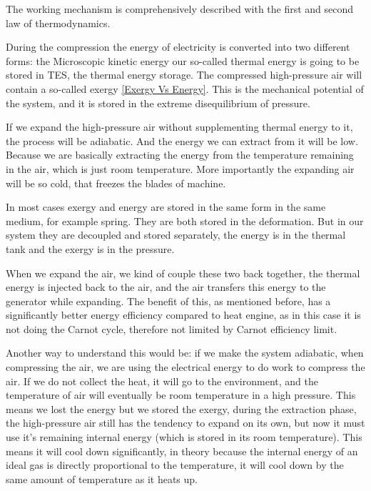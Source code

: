 The working mechanism is comprehensively described with the first and second law of thermodynamics.

During the compression the energy of electricity is converted into two different forms: the Microscopic kinetic energy our so-called thermal energy is going to be stored in TES, the thermal energy storage. The compressed high-pressure air will contain a so-called exergy \href{https://www.youtube.com/watch?v=2TPefBIVZZo&pp=ygUGZXhlcmd5}{[Exergy Vs Energy]}. This is the mechanical potential of the system, and it is stored in the extreme disequilibrium of pressure. 

If we expand the high-pressure air without supplementing thermal energy to it, the process will be adiabatic. And the energy we can extract from it will be low. Because we are basically extracting the energy from the temperature remaining in the air, which is just room temperature. More importantly the expanding air will be so cold, that freezes the blades of machine. 

In most cases exergy and energy are stored in the same form in the same medium, for example spring. They are both stored in the deformation. But in our system they are decoupled and stored separately, the energy is in the thermal tank and the exergy is in the pressure.  

When we expand the air, we kind of couple these two back together, the thermal energy is injected back to the air, and the air transfers this energy to the generator while expanding. The benefit of this, as mentioned before, has a significantly better energy efficiency compared to heat engine, as in this case it is not doing the Carnot cycle, therefore not limited by Carnot efficiency limit. 

\vspace{2em}

Another way to understand this would be:
 if we make the system adiabatic,  
 when compressing the air, we are using the electrical energy to do work to compress the air. If we do not collect the heat, it will go to the environment, and the temperature of air will eventually be room temperature in a high pressure. This means we lost the energy but we stored the exergy, during the extraction phase, the high-pressure air still has the tendency to expand on its own, but now it must use it's remaining internal energy (which is stored in its room temperature). This means it will cool down significantly, in theory because the internal energy of an ideal gas is directly proportional to the temperature, it will cool down by the same amount of temperature as it heats up. 


